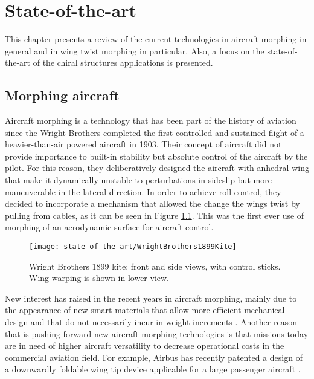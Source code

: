 \chapter{State-of-the-art} \label{chap:State_of_the_art}

This chapter presents a review of the current technologies in aircraft morphing in general and in wing twist morphing in particular. Also, a focus on the state-of-the-art of the chiral structures applications is presented.

\section{Morphing aircraft} \label{sec:Morphing_state}

  Aircraft morphing is a technology that has been part of the history of aviation since the Wright Brothers completed the first controlled and sustained flight of a heavier-than-air powered aircraft in 1903. Their concept of aircraft did not provide importance to built-in stability but absolute control of the aircraft by the pilot. For this reason, they deliberatively designed the aircraft with anhedral wing that make it dynamically unstable to perturbations in sideslip but more maneuverable in the lateral direction. In order to achieve roll control, they decided to incorporate a mechanism that allowed the change the wings twist by pulling from cables, as it can be seen in Figure \ref{fig:Wright}. This was the first ever use of morphing of an aerodynamic surface for aircraft control.

  \begin{figure}[!htpb]
    \centering
    \texttt{[image: state-of-the-art/WrightBrothers1899Kite]}
    \caption[Wright Brothers 1899 kite]{Wright Brothers 1899 kite: front and side views, with control sticks. Wing-warping is shown in lower view. \cite{Wright}}\label{fig:Wright}
  \end{figure}

  New interest has raised in the recent years in aircraft morphing, mainly due to the appearance of new smart materials that allow more efficient mechanical design and that do not necessarily incur in weight increments \cite{Lloyd2007}. Another reason that is pushing forward new aircraft morphing technologies is that missions today are in need of higher aircraft versatility to decrease operational costs in the commercial aviation field. For example, Airbus has recently patented a design of a downwardly foldable wing tip device applicable for a large passenger aircraft \cite{Boye2015}.

